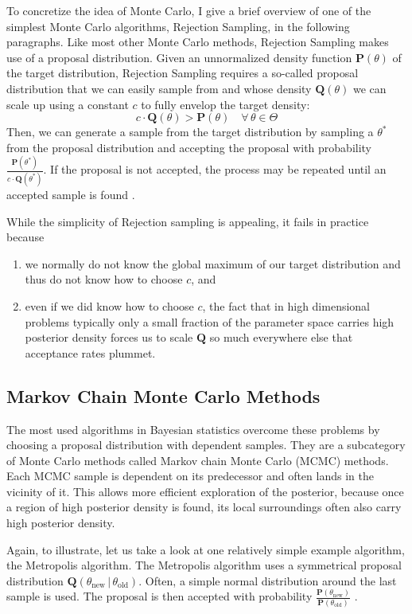 \documentclass[12pt, a4paper]{report}
\begin{document}
To concretize the idea of Monte Carlo, I give a brief overview of one of the simplest Monte Carlo algorithms, Rejection Sampling, in the following paragraphs.
Like most other Monte Carlo methods, Rejection Sampling makes use of a proposal distribution.
Given an unnormalized density function $\mathbf{P}(\theta)$ of the target distribution, Rejection Sampling requires a so-called proposal distribution that we can easily sample from and whose density $\mathbf{Q}(\theta)$ we can scale up using a constant $c$ to fully envelop the target density:
\begin{equation}
    c \cdot \mathbf{Q}(\theta) > \mathbf{P}(\theta) \quad \forall \, \theta \in \Theta \nonumber
\end{equation}
Then, we can generate a sample from the target distribution by sampling a $\theta^*$ from the proposal distribution and accepting the proposal with probability $\frac{\mathbf{P}(\theta^*)}{c \cdot \mathbf{Q}(\theta^*)}$.
If the proposal is not accepted, the process may be repeated until an accepted sample is found \cite[364]{mckay}.

While the simplicity of Rejection sampling is appealing, it fails in practice because
\begin{enumerate}
    \item we normally do not know the global maximum of our target distribution and thus do not know how to choose $c$, and
    \item even if we did know how to choose $c$, the fact that in high dimensional problems typically only a small fraction of the parameter space carries high posterior density forces us to scale $\mathbf{Q}$ so much everywhere else that acceptance rates plummet.
\end{enumerate}

\subsection{Markov Chain Monte Carlo Methods}
The most used algorithms in Bayesian statistics overcome these problems by choosing a proposal distribution with dependent samples.
They are a subcategory of Monte Carlo methods called Markov chain Monte Carlo (MCMC) methods.
Each MCMC sample is dependent on its predecessor and often lands in the vicinity of it.
This allows more efficient exploration of the posterior, because once a region of high posterior density is found, its local surroundings often also carry high posterior density. 

Again, to illustrate, let us take a look at one relatively simple example algorithm, the Metropolis algorithm.
The Metropolis algorithm uses a symmetrical proposal distribution $\mathbf{Q}(\theta_{\textrm{new}} \,|\, \theta_{\textrm{old}})$.
Often, a simple normal distribution around the last sample is used.
The proposal is then accepted with probability $\frac{\mathbf{P}(\theta_{\textrm{new}})}{\mathbf{P}(\theta_{\textrm{old}})}$ \cite[p. 365f.]{mckay}.
\end{document}
